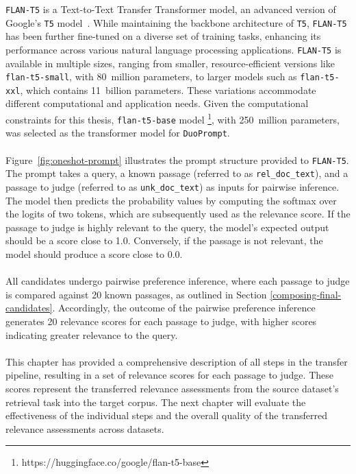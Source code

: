 \texttt{FLAN-T5} is a Text-to-Text Transfer Transformer model, an advanced version of Google's \texttt{T5} model~\citep{raffel:2020}. While maintaining the backbone architecture of \texttt{T5}, \texttt{FLAN-T5} has been further fine-tuned on a diverse set of training tasks, enhancing its performance across various natural language processing applications. \texttt{FLAN-T5} is available in multiple sizes, ranging from smaller, resource-efficient versions like \texttt{flan-t5-small}, with 80~million parameters, to larger models such as \texttt{flan-t5-xxl}, which contains 11~billion parameters. These variations accommodate different computational and application needs. Given the computational constraints for this thesis, \texttt{flan-t5-base} model \footnote{https://huggingface.co/google/flan-t5-base}, with 250~million parameters, was selected as the transformer model for \texttt{DuoPrompt}.
\\\\
Figure~\ref{fig:oneshot-prompt} illustrates the prompt structure provided to \texttt{FLAN-T5}. The prompt takes a query, a known passage (referred to as \texttt{rel\_doc\_text}), and a passage to judge (referred to as \texttt{unk\_doc\_text}) as inputs for pairwise inference. The model then predicts the probability values by computing the softmax over the logits of two tokens, which are subsequently used as the relevance score. If the passage to judge is highly relevant to the query, the model's expected output should be a score close to 1.0. Conversely, if the passage is not relevant, the model should produce a score close to 0.0.
\\\\
All candidates undergo pairwise preference inference, where each passage to judge is compared against 20 known passages, as outlined in Section \ref{composing-final-candidates}. Accordingly, the outcome of the pairwise preference inference generates 20 relevance scores for each passage to judge, with higher scores indicating greater relevance to the query.
\\\\
This chapter has provided a comprehensive description of all steps in the transfer pipeline, resulting in a set of relevance scores for each passage to judge. These scores represent the transferred relevance assessments from the source dataset's retrieval task into the target corpus. The next chapter will evaluate the effectiveness of the individual steps and the overall quality of the transferred relevance assessments across datasets.
